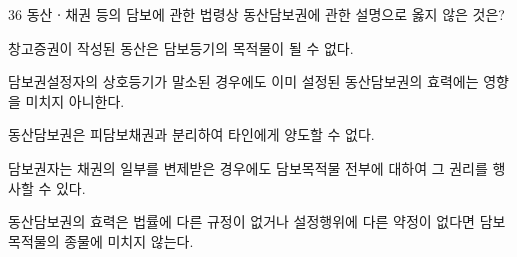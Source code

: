\begin{question}{36}
동산ㆍ채권 등의 담보에 관한 법령상 동산담보권에 관한 설명으로 옳지 않은 것은?
\begin{choices}
  \item 창고증권이 작성된 동산은 담보등기의 목적물이 될 수 없다.
  \item 담보권설정자의 상호등기가 말소된 경우에도 이미 설정된 동산담보권의 효력에는 영향을 미치지 아니한다.
  \item 동산담보권은 피담보채권과 분리하여 타인에게 양도할 수 없다.
  \item 담보권자는 채권의 일부를 변제받은 경우에도 담보목적물 전부에 대하여 그 권리를 행사할 수 있다.
  \item 동산담보권의 효력은 법률에 다른 규정이 없거나 설정행위에 다른 약정이 없다면 담보목적물의 종물에 미치지 않는다.
\end{choices}
\end{question}
